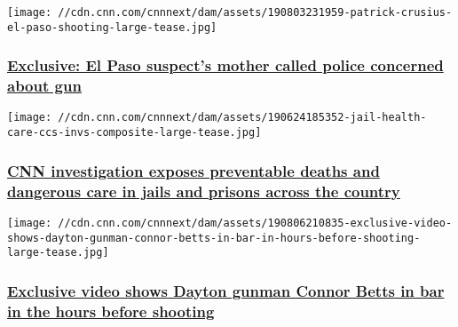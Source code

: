 \href{/2019/08/07/us/el-paso-crusius-gun-warning/index.html}{}

\texttt{[image: //cdn.cnn.com/cnnnext/dam/assets/190803231959-patrick-crusius-el-paso-shooting-large-tease.jpg]}

\hypertarget{exclusive-el-paso-suspects-mother-called-police-concerned-about-gun}{%
\subsubsection{\texorpdfstring{\href{/2019/08/07/us/el-paso-crusius-gun-warning/index.html}{Exclusive:
El Paso suspect's mother called police concerned about
gun}}{Exclusive: El Paso suspect's mother called police concerned about gun}}\label{exclusive-el-paso-suspects-mother-called-police-concerned-about-gun}}

\href{https://www.cnn.com/interactive/2019/06/us/jail-health-care-ccs-invs/}{}

\texttt{[image: //cdn.cnn.com/cnnnext/dam/assets/190624185352-jail-health-care-ccs-invs-composite-large-tease.jpg]}

\hypertarget{cnn-investigation-exposes-preventable-deaths-and-dangerous-care-in-jails-and-prisons-across-the-country}{%
\subsubsection{\texorpdfstring{\href{https://www.cnn.com/interactive/2019/06/us/jail-health-care-ccs-invs/}{CNN
investigation exposes preventable deaths and dangerous care in jails and
prisons across the
country}}{CNN investigation exposes preventable deaths and dangerous care in jails and prisons across the country}}\label{cnn-investigation-exposes-preventable-deaths-and-dangerous-care-in-jails-and-prisons-across-the-country}}

\href{/2019/08/06/us/surveillance-video-connor-betts-in-bar/index.html}{}

\texttt{[image: //cdn.cnn.com/cnnnext/dam/assets/190806210835-exclusive-video-shows-dayton-gunman-connor-betts-in-bar-in-hours-before-shooting-large-tease.jpg]}

\hypertarget{exclusive-video-shows-dayton-gunman-connor-betts-in-bar-in-the-hours-before-shooting}{%
\subsubsection{\texorpdfstring{\href{/2019/08/06/us/surveillance-video-connor-betts-in-bar/index.html}{Exclusive
video shows Dayton gunman Connor Betts in bar in the hours before
shooting}}{Exclusive video shows Dayton gunman Connor Betts in bar in the hours before shooting}}\label{exclusive-video-shows-dayton-gunman-connor-betts-in-bar-in-the-hours-before-shooting}}

